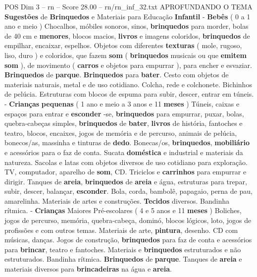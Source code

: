 \begin{textsample}{POS Dim 3 – rn – Score 28.00 – rn/rn\_inf\_32.txt}  \label{ex:f3_pos_092}
APROFUNDANDO O TEMA \textbf{Sugestões} de \textbf{Brinquedos} e Materiais para Educação \textbf{Infantil} - \textbf{Bebês} ( 0 a 1 ano e meio ) Chocalhos, móbiles sonoros, sinos, \textbf{brinquedos} para morder, bolas de 40 cm e \textbf{menores}, blocos macios, \textbf{livros} e imagens coloridos, \textbf{brinquedos} de empilhar, encaixar, espelhos.
Objetos com diferentes \textbf{texturas} ( mole, rugoso, liso, duro ) e coloridos, que fazem \textbf{som} ( \textbf{brinquedos} musicais ou que \textbf{emitem} \textbf{som} ), de movimento ( \textbf{carros} e objetos para empurrar ), para encher e esvaziar. \textbf{Brinquedos} de \textbf{parque}. \textbf{Brinquedos} para \textbf{bater}.
Cesto com objetos de materiais naturais, metal e de uso cotidiano.
Colcha, rede e colchonete.
Bichinhos de pelúcia.
Estruturas com blocos de espuma para subir, descer, entrar em túneis. - \textbf{Crianças} \textbf{pequenas} ( 1 ano e meio a 3 anos e 11 \textbf{meses} ) Túneis, caixas e espaços para entrar e \textbf{esconder} -se, \textbf{brinquedos} para empurrar, puxar, bolas, quebra-cabeças simples, \textbf{brinquedos} de \textbf{bater}, \textbf{livros} de história, fantoches e teatro, blocos, encaixes, jogos de memória e de percurso, animais de pelúcia, bonecos/as, massinha e tinturas de \textbf{dedo}.
Bonecas/os, \textbf{brinquedos}, \textbf{mobiliário} e acessórios para o faz de conta.
Sucata \textbf{doméstica} e industrial e materiais da natureza.
Sacolas e latas com objetos diversos de uso cotidiano para exploração.
TV, computador, aparelho de \textbf{som}, CD.
Triciclos e \textbf{carrinhos} para empurrar e dirigir.
Tanques de \textbf{areia}, \textbf{brinquedos} de \textbf{areia} e água, estruturas para trepar, subir, descer, balançar, \textbf{esconder}.
Bola, corda, bambolê, papagaio, perna de pau, amarelinha.
Materiais de artes e construções. \textbf{Tecidos} diversos.
Bandinha rítmica. - \textbf{Crianças} Maiores Pré-escolares ( 4 e 5 anos e 11 \textbf{meses} ) Boliches, jogos de percurso, memória, quebra-cabeça, dominó, blocos lógicos, loto, jogos de profissões e com outros temas.
Materiais de arte, \textbf{pintura}, desenho.
CD com músicas, danças.
Jogos de construção, \textbf{brinquedos} para faz de conta e acessórios para \textbf{brincar}, teatro e fantoches.
Materiais e \textbf{brinquedos} estruturados e não estruturados.
Bandinha rítmica. \textbf{Brinquedos} de \textbf{parque}.
Tanques de \textbf{areia} e materiais diversos para \textbf{brincadeiras} na água e \textbf{areia}.

\end{textsample}
